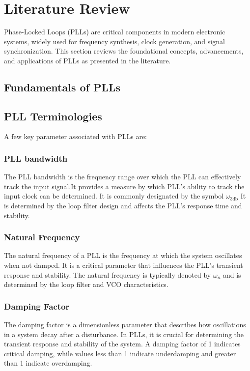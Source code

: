 \chapter{Literature Review}

Phase-Locked Loops (PLLs) are critical components in modern electronic systems, widely used for frequency synthesis, clock generation, and signal synchronization. This section reviews the foundational concepts, advancements, and applications of PLLs as presented in the literature.

\section{Fundamentals of PLLs}
\section{PLL Terminologies}
A few key parameter associated with PLLs are:
\subsection{PLL bandwidth}
The PLL bandwidth is the frequency range over which the PLL can effectively track the input signal.It provides a measure by which PLL’s ability to track the input clock can be determined. It is commonly designated by the symbol \( \omega_{\text{3db}} \) It is determined by the loop filter design and affects the PLL's response time and stability.
\subsection{Natural Frequency}
The natural frequency of a PLL is the frequency at which the system oscillates when not damped. It is a critical parameter that influences the PLL's transient response and stability. The natural frequency is typically denoted by \( \omega_n \) and is determined by the loop filter and VCO characteristics.
\subsection{Damping Factor}
The damping factor is a dimensionless parameter that describes how oscillations in a system decay after a disturbance. In PLLs, it is crucial for determining the transient response and stability of the system. A damping factor of 1 indicates critical damping, while values less than 1 indicate underdamping and greater than 1 indicate overdamping.

